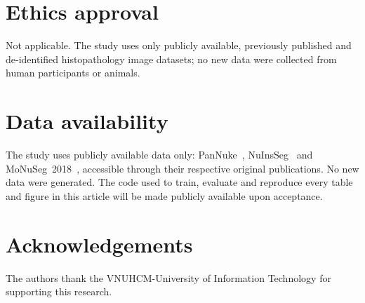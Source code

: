 \documentclass[preprint,12pt]{elsarticle}
\begin{document}
\section*{Ethics approval}
Not applicable. The study uses only publicly available, previously published and de-identified histopathology
image datasets; no new data were collected from human participants or animals.

\section*{Data availability}
The study uses publicly available data only: PanNuke~\cite{pannuke}, NuInsSeg~\cite{nuinsseg} and
MoNuSeg~2018~\cite{monuseg}, accessible through their respective original publications. No new data were
generated. The code used to train, evaluate and reproduce every table and figure in this article will be made
publicly available upon acceptance.

\section*{Acknowledgements}
The authors thank the VNUHCM-University of Information Technology for supporting this research.



\end{document}
